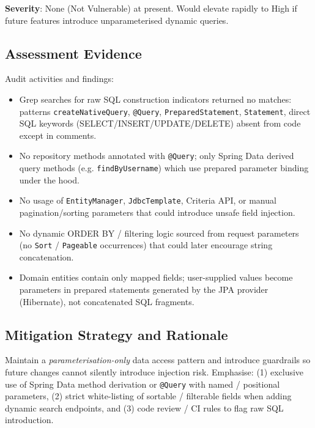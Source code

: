 \documentclass[]{UCD_CS_FYP_Report}
\begin{document}
	\textbf{Severity}: None (Not Vulnerable) at present. Would elevate rapidly to High if future features introduce unparameterised dynamic queries.


\subsection*{Assessment Evidence}
Audit activities and findings:
\begin{itemize}
 \item Grep searches for raw SQL construction indicators returned no matches: patterns \texttt{createNativeQuery}, \texttt{@Query}, \texttt{PreparedStatement}, \texttt{Statement}, direct SQL keywords (SELECT/INSERT/UPDATE/DELETE) absent from code except in comments.
 \item No repository methods annotated with \texttt{@Query}; only Spring Data derived query methods (e.g. \texttt{findByUsername}) which use prepared parameter binding under the hood.
 \item No usage of \texttt{EntityManager}, \texttt{JdbcTemplate}, Criteria API, or manual pagination/sorting parameters that could introduce unsafe field injection.
 \item No dynamic ORDER BY / filtering logic sourced from request parameters (no \texttt{Sort} / \texttt{Pageable} occurrences) that could later encourage string concatenation.
 \item Domain entities contain only mapped fields; user-supplied values become parameters in prepared statements generated by the JPA provider (Hibernate), not concatenated SQL fragments.
\end{itemize}


\subsection*{Mitigation Strategy and Rationale}
Maintain a \textit{parameterisation-only} data access pattern and introduce guardrails so future changes cannot silently introduce injection risk. Emphasise: (1) exclusive use of Spring Data method derivation or \texttt{@Query} with named / positional parameters, (2) strict white-listing of sortable / filterable fields when adding dynamic search endpoints, and (3) code review / CI rules to flag raw SQL introduction.
\end{document}
